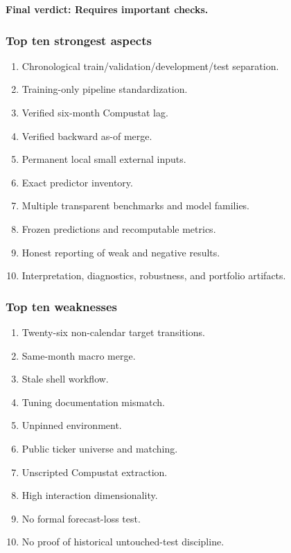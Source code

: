 \documentclass[
  11pt,
  a4paper]{article}
\providecommand{\tightlist}{%
  \setlength{\itemsep}{0pt}\setlength{\parskip}{0pt}}
\begin{document}
\textbf{Final verdict: Requires important checks.}

\subsubsection{Top ten strongest
aspects}\label{top-ten-strongest-aspects}

\begin{enumerate}
\def\labelenumi{\arabic{enumi}.}
\tightlist
\item
  Chronological train/validation/development/test separation.
\item
  Training-only pipeline standardization.
\item
  Verified six-month Compustat lag.
\item
  Verified backward as-of merge.
\item
  Permanent local small external inputs.
\item
  Exact predictor inventory.
\item
  Multiple transparent benchmarks and model families.
\item
  Frozen predictions and recomputable metrics.
\item
  Honest reporting of weak and negative results.
\item
  Interpretation, diagnostics, robustness, and portfolio artifacts.
\end{enumerate}

\subsubsection{Top ten weaknesses}\label{top-ten-weaknesses}

\begin{enumerate}
\def\labelenumi{\arabic{enumi}.}
\tightlist
\item
  Twenty-six non-calendar target transitions.
\item
  Same-month macro merge.
\item
  Stale shell workflow.
\item
  Tuning documentation mismatch.
\item
  Unpinned environment.
\item
  Public ticker universe and matching.
\item
  Unscripted Compustat extraction.
\item
  High interaction dimensionality.
\item
  No formal forecast-loss test.
\item
  No proof of historical untouched-test discipline.
\end{enumerate}
\end{document}
